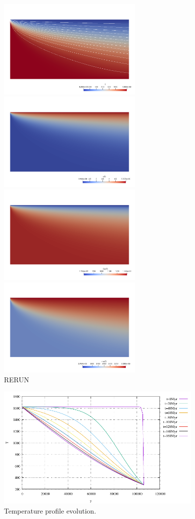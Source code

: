 \begin{center}
\includegraphics[width=7cm]{python_codes/fieldstone_83/results_model2/T}
\includegraphics[width=7cm]{python_codes/fieldstone_83/results_model2/k}\\
\includegraphics[width=7cm]{python_codes/fieldstone_83/results_model2/Cp}
\includegraphics[width=7cm]{python_codes/fieldstone_83/results_model2/rho.png}\\
{\captionfont RERUN}
\end{center}

\begin{center}
\includegraphics[width=10cm]{python_codes/fieldstone_83/results_model2/Tprofiles}\\
{\captionfont Temperature profile evolution.}
\end{center}



